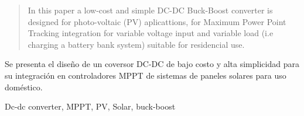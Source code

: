\begin{abstract}


    In this paper a low-cost and simple DC-DC Buck-Boost converter is designed for photo-voltaic (PV) aplicattions, for Maximum Power Point Tracking integration for variable voltage input and variable load (i.e charging a battery bank system) suitable for residencial use. 
    

\end{abstract}
\begin{resumen}
   Se presenta el diseño de un coversor DC-DC de bajo costo y alta simplicidad para su integración en controladores MPPT de sistemas de paneles solares para uso doméstico. 
\end{resumen}

\begin{IEEEkeywords}
   Dc-dc converter, MPPT, PV, Solar, buck-boost
\end{IEEEkeywords}